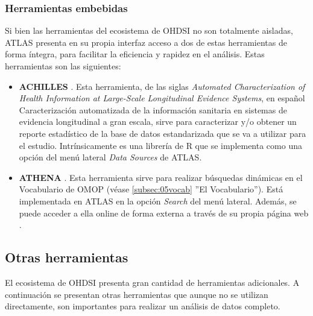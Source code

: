 \subsubsection{Herramientas embebidas}

Si bien las herramientas del ecosistema de OHDSI no son totalmente aisladas, ATLAS presenta en su propia interfaz acceso a dos de estas herramientas de forma íntegra, para facilitar la eficiencia y rapidez en el análisis. Estas herramientas son las siguientes:

\begin{itemize}

    \item \textbf{ACHILLES} \cite{githubACHILLES}. Esta herramienta, de las siglas \textit{Automated Characterization of Health Information at Large-Scale Longitudinal Evidence Systems}, en español Caracterización automatizada de la información sanitaria en sistemas de evidencia longitudinal a gran escala, sirve para caracterizar y/o obtener un reporte estadístico de la base de datos estandarizada que se va a utilizar para el estudio. Intrínsicamente es una librería de R que se implementa como una opción del menú lateral \textit{Data Sources} de ATLAS.
    \item \textbf{ATHENA} \cite{githubATHENA}. Esta herramienta sirve para realizar búsquedas dinámicas en el Vocabulario de OMOP (véase \ref{subsec:05vocab} ''El Vocabulario''). Está implementada en ATLAS en la opción \textit{Search} del menú lateral. Además, se puede acceder a ella online de forma externa a través de su propia página web \cite{ATHENAweb}.
    
\end{itemize}


\subsection{Otras herramientas} \label{subsec:05otrasHerramientas}

El ecosistema de OHDSI presenta gran cantidad de herramientas adicionales. A continuación se presentan otras herramientas que aunque no se utilizan directamente, son importantes para realizar un análisis de datos completo. 

